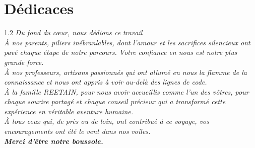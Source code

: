 \documentclass[12pt,a4paper,openany,oneside]{report}
\begin{document}
\chapter*{Dédicaces}
\thispagestyle{plain}
\begin{center}
    \vspace*{1cm}
    \large
    \begin{spacing}{1.2}
    \itshape
    Du fond du cœur, nous dédions ce travail\\[1em]
    
    À nos parents, piliers inébranlables, dont l'amour et les sacrifices silencieux ont pavé chaque étape de notre parcours. Votre confiance en nous est notre plus grande force.\\[1em]
    
    À nos professeurs, artisans passionnés qui ont allumé en nous la flamme de la connaissance et nous ont appris à voir au-delà des lignes de code.\\[1em]
    
    À la famille REETAIN, pour nous avoir accueillis comme l'un des vôtres, pour chaque sourire partagé et chaque conseil précieux qui a transformé cette expérience en véritable aventure humaine.\\[1em]
    
    À tous ceux qui, de près ou de loin, ont contribué à ce voyage, vos encouragements ont été le vent dans nos voiles.\\[2em]
    
    \normalfont\bfseries Merci d'être notre boussole.\\
    \end{spacing}
    \vspace*{1cm}
\end{center}

\end{document}
